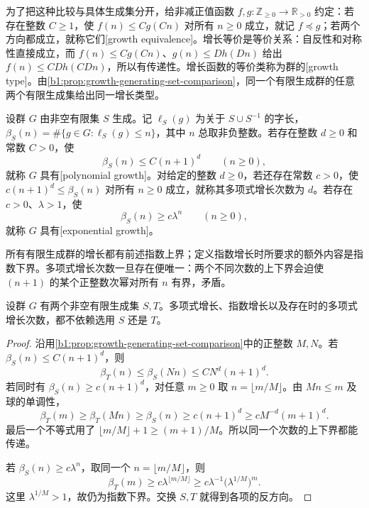 为了把这种比较与具体生成集分开，给非减正值函数 \(f,g:\mathbb Z_{\ge0}\rightarrow\mathbb R_{>0}\) 约定：若存在整数 \(C\ge1\)，使 \(f(n)\le Cg(Cn)\) 对所有 \(n\ge0\) 成立，就记 \(f\preccurlyeq g\)；若两个方向都成立，就称它们[growth equivalence]。增长等价是等价关系：自反性和对称性直接成立，而 \(f(n)\le Cg(Cn)\)、\(g(n)\le Dh(Dn)\) 给出 \(f(n)\le CDh(CDn)\)，所以有传递性。增长函数的等价类称为群的[growth type]。由\cref{b1:prop:growth-generating-set-comparison}，同一个有限生成群的任意两个有限生成集给出同一增长类型。

\begin{definition}\label{b1:def:polynomial-exponential-growth}
	设群 \(G\) 由非空有限集 \(S\) 生成。记 \(\ell_S(g)\) 为关于 \(S\cup S^{-1}\) 的字长，\(\beta_S(n)=\#\{g\in G:\ell_S(g)\le n\}\)，其中 \(n\) 总取非负整数。若存在整数 \(d\ge0\) 和常数 \(C>0\)，使
	\[
		\beta_S(n)\le C(n+1)^d\qquad(n\ge0),
	\]
	就称 \(G\) 具有[polynomial growth]。对给定的整数 \(d\ge0\)，若还存在常数 \(c>0\)，使 \(c(n+1)^d\le\beta_S(n)\) 对所有 \(n\ge0\) 成立，就称其多项式增长次数为 \(d\)。若存在 \(c>0\)、\(\lambda>1\)，使
	\[
		\beta_S(n)\ge c\lambda^n\qquad(n\ge0),
	\]
	就称 \(G\) 具有[exponential growth]。
\end{definition}

所有有限生成群的增长都有前述指数上界；定义指数增长时所要求的额外内容是指数下界。多项式增长次数一旦存在便唯一：两个不同次数的上下界会迫使 \((n+1)\) 的某个正整数次幂对所有 \(n\) 有界，矛盾。

\begin{corollary}\label{b1:cor:growth-rates-independent}
	设群 \(G\) 有两个非空有限生成集 \(S,T\)。多项式增长、指数增长以及存在时的多项式增长次数，都不依赖选用 \(S\) 还是 \(T\)。
\end{corollary}
\begin{proof}
	沿用\cref{b1:prop:growth-generating-set-comparison}中的正整数 \(M,N\)。若 \(\beta_S(n)\le C(n+1)^d\)，则
	\[
		\beta_T(n)\le\beta_S(Nn)\le CN^d(n+1)^d.
	\]
	若同时有 \(\beta_S(n)\ge c(n+1)^d\)，对任意 \(m\ge0\) 取 \(n=\lfloor m/M\rfloor\)。由 \(Mn\le m\) 及球的单调性，
	\[
		\beta_T(m)\ge\beta_T(Mn)\ge\beta_S(n)
		\ge c(n+1)^d\ge cM^{-d}(m+1)^d.
	\]
	最后一个不等式用了 \(\lfloor m/M\rfloor+1\ge(m+1)/M\)。所以同一个次数的上下界都能传递。

	若 \(\beta_S(n)\ge c\lambda^n\)，取同一个 \(n=\lfloor m/M\rfloor\)，则
	\[
		\beta_T(m)\ge c\lambda^{\lfloor m/M\rfloor}
		\ge c\lambda^{-1}\bigl(\lambda^{1/M}\bigr)^m.
	\]
	这里 \(\lambda^{1/M}>1\)，故仍为指数下界。交换 \(S,T\) 就得到各项的反方向。
\end{proof}

